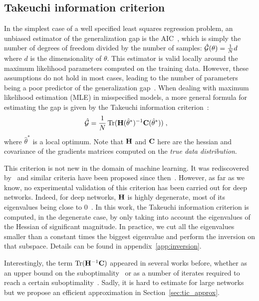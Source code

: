 \subsection{Takeuchi information criterion}
In the simplest case of a well specified least squares regression problem, an unbiased estimator of the generalization gap is the AIC~\citep{akaike1974new}, which is simply the number of degrees of freedom divided by the number of samples: $\displaystyle\hat{{\mathcal{G}}}(\theta) = \tfrac{1}{N} d$ where $d$ is the dimensionality of $\theta$. This estimator is valid locally around the maximum likelihood parameters computed on the training data.  However, these assumptions do not hold in most cases, leading to the number of parameters being a poor predictor of the generalization gap~\citep{novak2018sensitivity}.
When dealing with maximum likelihood estimation (MLE) in misspecified models, a more general formula for estimating the gap is given by the Takeuchi information criterion~\citep[TIC:][]{takeuchi1976distribution}:
\begin{align}
\label{eq:tic}
  \hat{{\mathcal{G}}} &= \frac{1}{N} \operatorname{Tr}({\mathbf{H}}(\hat\theta^\ast)^{-1} {\mathbf{C}}(\hat\theta^\ast))  \; ,
\end{align}
where $\hat\theta^\ast$ is a local optimum. Note that ${\mathbf{H}}$ and ${\mathbf{C}}$ here are the hessian and covariance of the gradients matrices computed on the \emph{true data distribution}.

This criterion is not new in the domain of machine learning. It was rediscovered by~\citet{murata1994network} and similar criteria have been proposed since then~\citep{beirami2017optimal, wang2018approximate}. However, as far as we know, no experimental validation of this criterion has been carried out for deep networks.
Indeed, for deep networks, ${\mathbf{H}}$ is highly degenerate, most of its eigenvalues being close to $0$~\citep{sagun2016eigenvalues}. In this work, the Takeuchi information criterion is computed, in the degenerate case, by only taking into account the eigenvalues of the Hessian of significant magnitude. In practice, we cut all the eigenvalues smaller than a constant times the biggest eigenvalue and perform the inversion on that subspace. Details can be found in appendix~\ref{app:inversion}.

Interestingly, the term $\operatorname{Tr}({\mathbf{H}}^{-1}{\mathbf{C}})$ appeared in several works before, whether as an upper bound on the suboptimality~\citep{flammarion2015averaging} or as a number of iterates required to reach a certain suboptimality~\citep{bottou2008tradeoffs}. Sadly, it is hard to estimate for large networks but we propose an efficient approximation in Section~\ref{sec:tic_approx}.



